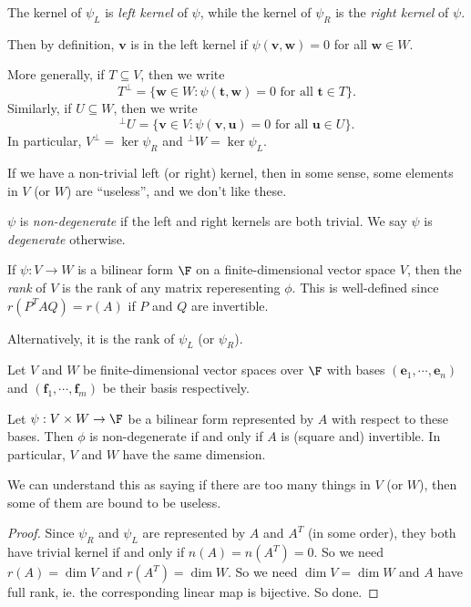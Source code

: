 \documentclass[a4paper]{article}
\begin{document}
\begin{defi}
  The kernel of $\psi_L$ is \emph{left kernel} of $\psi$, while the kernel of $\psi_R$ is the \emph{right kernel} of $\psi$.
\end{defi}
Then by definition, $\mathbf{v}$ is in the left kernel if $\psi(\mathbf{v}, \mathbf{w}) = 0$ for all $\mathbf{w} \in W$.

More generally, if $T\subseteq V$, then we write
\[
  T^\bot = \{\mathbf{w} \in W: \psi(\mathbf{t}, \mathbf{w}) = 0\text{ for all }\mathbf{t} \in T\}.
\]
Similarly, if $U\subseteq W$, then we write
\[
  ^\bot U = \{\mathbf{v} \in V: \psi(\mathbf{v}, \mathbf{u}) = 0\text{ for all }\mathbf{u}\in U\}.
\]
In particular, $V^\bot = \ker \psi_R$ and $^\bot W = \ker \psi_L$.

If we have a non-trivial left (or right) kernel, then in some sense, some elements in $V$ (or $W$) are ``useless'', and we don't like these.
\begin{defi}
  $\psi$ is \emph{non-degenerate} if the left and right kernels are both trivial. We say $\psi$ is \emph{degenerate} otherwise.
\end{defi}

\begin{defi}
  If $\psi: V\to W$ is a bilinear form $\F$ on a finite-dimensional vector space $V$, then the \emph{rank} of $V$ is the rank of any matrix reperesenting $\phi$. This is well-defined since $r(P^T AQ) = r(A)$ if $P$ and $Q$ are invertible.

  Alternatively, it is the rank of $\psi_L$ (or $\psi_R$).
\end{defi}

\begin{lemma}
  Let $V$ and $W$ be finite-dimensional vector spaces over $\F$ with bases $(\mathbf{e}_1, \cdots, \mathbf{e}_n)$ and $(\mathbf{f}_1, \cdots, \mathbf{f}_m)$ be their basis respectively.

  Let $\psi: V\times W \to \F$ be a bilinear form represented by $A$ with respect to these bases. Then $\phi$ is non-degenerate if and only if $A$ is (square and) invertible. In particular, $V$ and $W$ have the same dimension.
\end{lemma}
We can understand this as saying if there are too many things in $V$ (or $W$), then some of them are bound to be useless.

\begin{proof}
  Since $\psi_R$ and $\psi_L$ are represented by $A$ and $A^T$ (in some order), they both have trivial kernel if and only if $n(A) = n(A^T) = 0$. So we need $r(A) = \dim V$ and $r(A^T) = \dim W$. So we need $\dim V = \dim W$ and $A$ have full rank, ie. the corresponding linear map is bijective. So done.
\end{proof}
\end{document}
